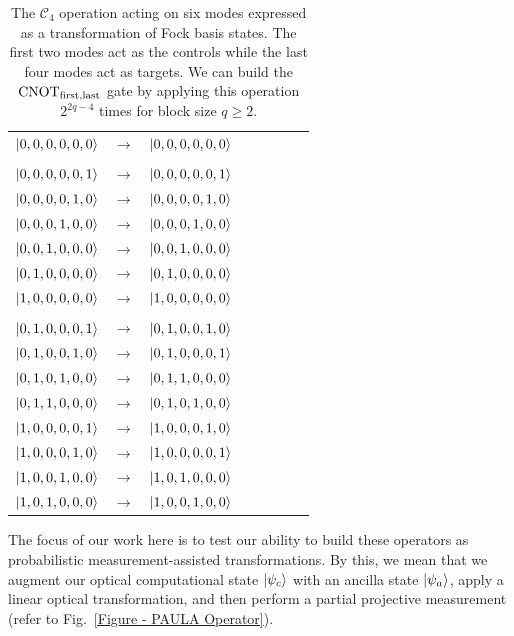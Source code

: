 \documentclass[aps,pra,twocolumn,showpacs,superscriptaddress,floatfix,10pt]{revtex4}
\begin{document}
\begin {table}[h]
\begin{center}
	\begin{tabular}{l*{6}{c}r} 
		$\ket{0,0,0,0,0,0}$  &  $\rightarrow$ & $\ket{0,0,0,0,0,0}$ \\ \\
		$\ket{0,0,0,0,0,1}$  & $\rightarrow$ & $\ket{0,0,0,0,0,1}$ \\
		$\ket{0,0,0,0,1,0}$ & $\rightarrow$ & $\ket{0,0,0,0,1,0}$ \\
		$\ket{0,0,0,1,0,0}$ & $\rightarrow$ & $\ket{0,0,0,1,0,0} $ \\ 
		$\ket{0,0,1,0,0,0}$ & $\rightarrow$ & $\ket{0,0,1,0,0,0} $\\
		$\ket{0,1,0,0,0,0}$ & $\rightarrow$ & $\ket{0,1,0,0,0,0} $ \\
		$\ket{1,0,0,0,0,0}$ & $\rightarrow$ & $\ket{1,0,0,0,0,0} $ \\ \\
		$\ket{0,1,0,0,0,1}$  & $\rightarrow$ & $\ket{0,1,0,0,1,0}$ \\
		$\ket{0,1,0,0,1,0}$  & $\rightarrow$ & $\ket{0,1,0,0,0,1}$ \\
		$\ket{0,1,0,1,0,0}$  & $\rightarrow$ & $\ket{0,1,1,0,0,0}$ \\
		$\ket{0,1,1,0,0,0}$  & $\rightarrow$ & $\ket{0,1,0,1,0,0}$ \\
		$\ket{1,0,0,0,0,1}$  & $\rightarrow$ & $\ket{1,0,0,0,1,0}$ \\
		$\ket{1,0,0,0,1,0}$  & $\rightarrow$ & $\ket{1,0,0,0,0,1}$ \\
		$\ket{1,0,0,1,0,0}$  & $\rightarrow$ & $\ket{1,0,1,0,0,0}$ \\
		$\ket{1,0,1,0,0,0}$  & $\rightarrow$ & $\ket{1,0,0,1,0,0}$ \\
	\end{tabular}
	\caption{ \label{Two Controls Four Targets} The $\mathcal{C}_4$ operation acting on six modes expressed as a transformation of Fock basis states. The first two modes act as the controls while the last four modes act as targets. We can build the $\mbox{CNOT}_{\rm first,last}$ gate by applying this operation $2^{2 q - 4}$ times for block size $q \ge 2$.}
\end{center}
\end{table}
The focus of our work here is to test our ability to build these operators as probabilistic measurement-assisted transformations. By this, we mean that we augment our optical computational state $\ket{\psi_c}$ with an ancilla state $\ket{\psi_a}$, apply a linear optical transformation, and then perform a partial projective measurement (refer to Fig.~\ref{Figure - PAULA Operator}). 
\end{document}
